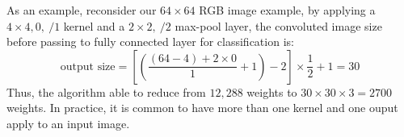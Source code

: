 As an example, reconsider our $64 \times 64$ RGB image example, by applying a $4 \times 4, 0, \ /1$ kernel and a $2 \times 2,\ /2$ max-pool layer, the convoluted image size before passing to fully connected layer for classification is:
\[
    \text{output size} = \left[ \left( \frac{(64 - 4) + 2 \times 0}{1} + 1 \right) - 2 \right] \times \frac{1}{2} + 1 = 30 
\] 
Thus, the algorithm able to reduce from $12,288$ weights to $30 \times 30 \times 3 = 2700$ weights. In practice, it is common to have more than one kernel and one ouput apply to an input image.


